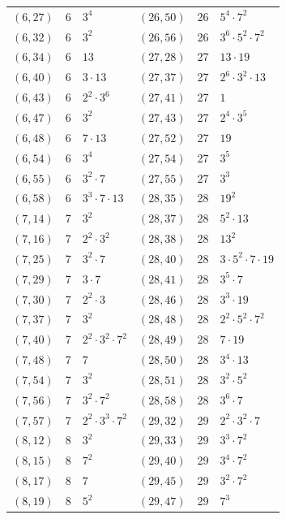 \documentclass[11pt]{article}
\begin{document}
\begin{longtable}{@{}lrl@{\qquad}lrl@{}}
$(6,27)$ & 6 & $3^{4}$ & $(26,50)$ & 26 & $5^{4}\cdot 7^{2}$\\
$(6,32)$ & 6 & $3^{2}$ & $(26,56)$ & 26 & $3^{6}\cdot 5^{2}\cdot 7^{2}$\\
$(6,34)$ & 6 & $13$ & $(27,28)$ & 27 & $13\cdot 19$\\
$(6,40)$ & 6 & $3\cdot 13$ & $(27,37)$ & 27 & $2^{6}\cdot 3^{2}\cdot 13$\\
$(6,43)$ & 6 & $2^{2}\cdot 3^{6}$ & $(27,41)$ & 27 & $1$\\
$(6,47)$ & 6 & $3^{2}$ & $(27,43)$ & 27 & $2^{4}\cdot 3^{5}$\\
$(6,48)$ & 6 & $7\cdot 13$ & $(27,52)$ & 27 & $19$\\
$(6,54)$ & 6 & $3^{4}$ & $(27,54)$ & 27 & $3^{5}$\\
$(6,55)$ & 6 & $3^{2}\cdot 7$ & $(27,55)$ & 27 & $3^{3}$\\
$(6,58)$ & 6 & $3^{3}\cdot 7\cdot 13$ & $(28,35)$ & 28 & $19^{2}$\\
$(7,14)$ & 7 & $3^{2}$ & $(28,37)$ & 28 & $5^{2}\cdot 13$\\
$(7,16)$ & 7 & $2^{2}\cdot 3^{2}$ & $(28,38)$ & 28 & $13^{2}$\\
$(7,25)$ & 7 & $3^{2}\cdot 7$ & $(28,40)$ & 28 & $3\cdot 5^{2}\cdot 7\cdot 19$\\
$(7,29)$ & 7 & $3\cdot 7$ & $(28,41)$ & 28 & $3^{5}\cdot 7$\\
$(7,30)$ & 7 & $2^{2}\cdot 3$ & $(28,46)$ & 28 & $3^{3}\cdot 19$\\
$(7,37)$ & 7 & $3^{2}$ & $(28,48)$ & 28 & $2^{2}\cdot 5^{2}\cdot 7^{2}$\\
$(7,40)$ & 7 & $2^{2}\cdot 3^{2}\cdot 7^{2}$ & $(28,49)$ & 28 & $7\cdot 19$\\
$(7,48)$ & 7 & $7$ & $(28,50)$ & 28 & $3^{4}\cdot 13$\\
$(7,54)$ & 7 & $3^{2}$ & $(28,51)$ & 28 & $3^{2}\cdot 5^{2}$\\
$(7,56)$ & 7 & $3^{2}\cdot 7^{2}$ & $(28,58)$ & 28 & $3^{6}\cdot 7$\\
$(7,57)$ & 7 & $2^{2}\cdot 3^{3}\cdot 7^{2}$ & $(29,32)$ & 29 & $2^{2}\cdot 3^{2}\cdot 7$\\
$(8,12)$ & 8 & $3^{2}$ & $(29,33)$ & 29 & $3^{3}\cdot 7^{2}$\\
$(8,15)$ & 8 & $7^{2}$ & $(29,40)$ & 29 & $3^{4}\cdot 7^{2}$\\
$(8,17)$ & 8 & $7$ & $(29,45)$ & 29 & $3^{2}\cdot 7^{2}$\\
$(8,19)$ & 8 & $5^{2}$ & $(29,47)$ & 29 & $7^{3}$\\

\end{longtable}
\end{document}
